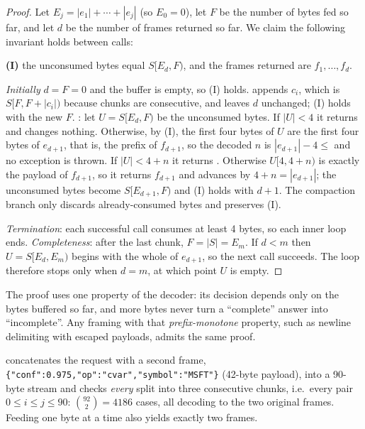 \begin{proof}
Let $E_j=|e_1|+\cdots+|e_j|$ (so $E_0=0$), let $F$ be the number of bytes fed so far, and let $d$ be the number of frames
returned so far. We claim the following invariant holds between calls:

\smallskip
\textbf{(I)} the unconsumed bytes \cc{buf_[pos_..)} equal $S[E_d, F)$, and the frames returned are $f_1,\dots,f_d$.

\smallskip
\emph{Initially} $d=F=0$ and the buffer is empty, so (I) holds. \emph{} appends $c_i$, which is $S[F,F+|c_i|)$
because chunks are consecutive, and leaves $d$ unchanged; (I) holds with the new $F$. \emph{}: let
$U=S[E_d,F)$ be the unconsumed bytes. If $|U|<4$ it returns  and changes nothing. Otherwise, by (I), the
first four bytes of $U$ are the first four bytes of $e_{d+1}$, that is, the prefix of $f_{d+1}$, so the decoded $n$ is
$|e_{d+1}|-4\le$  and no exception is thrown. If $|U|<4+n$ it returns . Otherwise
$U[4,4+n)$ is exactly the payload of $f_{d+1}$, so it returns $f_{d+1}$ and advances  by $4+n=|e_{d+1}|$;
the unconsumed bytes become $S[E_{d+1},F)$ and (I) holds with $d+1$. The compaction branch only discards
already-consumed bytes and preserves (I).

\emph{Termination}: each successful call consumes at least 4 bytes, so each inner loop ends. \emph{Completeness}: after
the last chunk, $F=|S|=E_m$. If $d<m$ then $U=S[E_d,E_m)$ begins with the whole of $e_{d+1}$, so the next call succeeds.
The loop therefore stops only when $d=m$, at which point $U$ is empty.
\end{proof}

\begin{remarkbox}
The proof uses one property of the decoder: its decision depends only on the bytes buffered so far, and more bytes
never turn a ``complete'' answer into ``incomplete''. Any framing with that \emph{prefix-monotone} property, such as
newline delimiting with escaped payloads, admits the same proof.
\end{remarkbox}

\begin{verified}
 concatenates the request with a second frame,
\texttt{\{"conf":0.975,"op":"cvar","symbol":"MSFT"\}} (42-byte payload), into a 90-byte stream and checks
\emph{every} split into three consecutive chunks, i.e.\ every pair $0\le i\le j\le 90$:
$\binom{92}{2}=4186$ cases, all decoding to the two original frames. Feeding one byte at a time also yields exactly two
frames.
\end{verified}

